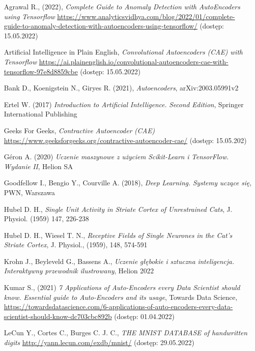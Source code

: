 \documentclass[12pt]{mwbk}
\theoremstyle{plain}
\theoremstyle{definition}
\theoremstyle{remark}
\begin{document}
\begin{thebibliography}{99}



 Agrawal R., (2022), \emph{Complete Guide to Anomaly Detection with AutoEncoders using Tensorflow} \url{https://www.analyticsvidhya.com/blog/2022/01/complete-guide-to-anomaly-detection-with-autoencoders-using-tensorflow/} (dostęp: 15.05.2022)

 Artificial Intelligence in Plain English, \emph{Convolutional Autoencoders (CAE) with Tensorflow} \url{https://ai.plainenglish.io/convolutional-autoencoders-cae-with-tensorflow-97e8d8859cbe} (dostęp: 15.05.2022)

 Bank D., Koenigstein N., Giryes R. (2021), \emph{Autoencoders}, arXiv:2003.05991v2




 Ertel W. (2017) \emph{Introduction to Artificial Intelligence. Second Edition}, Springer International Publishing

 Geeks For Geeks, \emph{Contractive Autoencoder (CAE)} \url{https://www.geeksforgeeks.org/contractive-autoencoder-cae/} (dostęp: 15.05.202)

 G\'eron A. (2020) \emph{Uczenie maszynowe z użyciem Scikit-Learn i TensorFlow. Wydanie II}, Helion SA

 Goodfellow I., Bengio Y., Courville A. (2018), \emph{Deep Learning. Systemy uczące się}, PWN, Warszawa 

 Hubel D. H., \emph{Single Unit Activity in  Striate Cortex of Unrestrained Cats}, J. Physiol. (1959) 147, 226-238

 Hubel D. H., Wiesel T. N., \emph{Receptive Fields of Single Neurones in the Cat's Striate Cortex}, J. Physiol., (1959), 148, 574-591




 Krohn J., Beyleveld G., Bassens A., \emph{Uczenie głębokie i sztuczna inteligencja. Interaktywny przewodnik ilustrowany}, Helion 2022

 Kumar S., (2021) \emph{7 Applications of Auto-Encoders every Data Scientist  should know. Essential guide to Auto-Encoders and its usage}, Towards Data Science, \url{https://towardsdatascience.com/6-applications-of-auto-encoders-every-data-scientist-should-know-dc703cbc892b} (dostęp: 01.04.2022)

 LeCun Y., Cortes C., Burges C. J. C., \emph{THE MNIST DATABASE of handwritten digits} \url{http://yann.lecun.com/exdb/mnist/} (dostęp: 29.05.2022)


\end{thebibliography}
\end{document}
